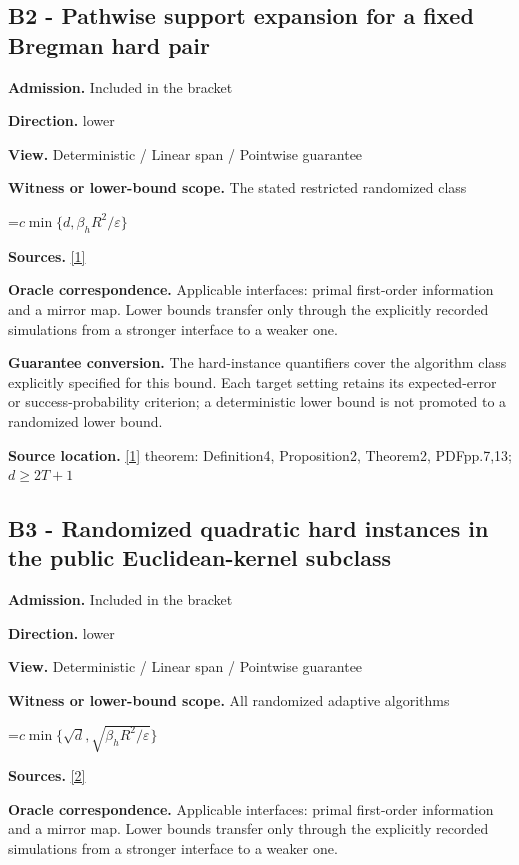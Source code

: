 \documentclass[10pt,a4paper]{article}
\newcommand{\AtlasMath}[1]{\par\begingroup\centering\setbox0=\hbox{$\displaystyle #1$}\ifdim\wd0>1.4\linewidth\typeout{ATLAS WIDE FORMULA: \the\wd0}\fi\ifdim\wd0>\linewidth\resizebox{\linewidth}{!}{\box0}\else\box0\fi\par\endgroup}
\begin{document}
\subsection{B2 - Pathwise support expansion for a fixed Bregman hard pair}
\textbf{Admission.} Included in the bracket

\textbf{Direction.} lower

\textbf{View.} Deterministic / Linear span / Pointwise guarantee

\textbf{Witness or lower-bound scope.} The stated restricted randomized class

\AtlasMath{c\min\{d,\beta_hR^2/\varepsilon\}}
\textbf{Sources.} \href{https://arxiv.org/pdf/1911.08510v3}{[1]}

\textbf{Oracle correspondence.} Applicable interfaces: primal first-order information and a mirror map. Lower bounds transfer only through the explicitly recorded simulations from a stronger interface to a weaker one.

\textbf{Guarantee conversion.} The hard-instance quantifiers cover the algorithm class explicitly specified for this bound. Each target setting retains its expected-error or success-probability criterion; a deterministic lower bound is not promoted to a randomized lower bound.

\textbf{Source location.} \href{https://arxiv.org/pdf/1911.08510v3}{[1]} theorem: Definition4, Proposition2, Theorem2, PDFpp.7,13; $d\ge 2T+1$

\subsection{B3 - Randomized quadratic hard instances in the public Euclidean-kernel subclass}
\textbf{Admission.} Included in the bracket

\textbf{Direction.} lower

\textbf{View.} Deterministic / Linear span / Pointwise guarantee

\textbf{Witness or lower-bound scope.} All randomized adaptive algorithms

\AtlasMath{c\min\{\sqrt d,\sqrt{\beta_hR^2/\varepsilon}\}}
\textbf{Sources.} \href{https://arxiv.org/pdf/2609.10874}{[2]}

\textbf{Oracle correspondence.} Applicable interfaces: primal first-order information and a mirror map. Lower bounds transfer only through the explicitly recorded simulations from a stronger interface to a weaker one.
\end{document}

